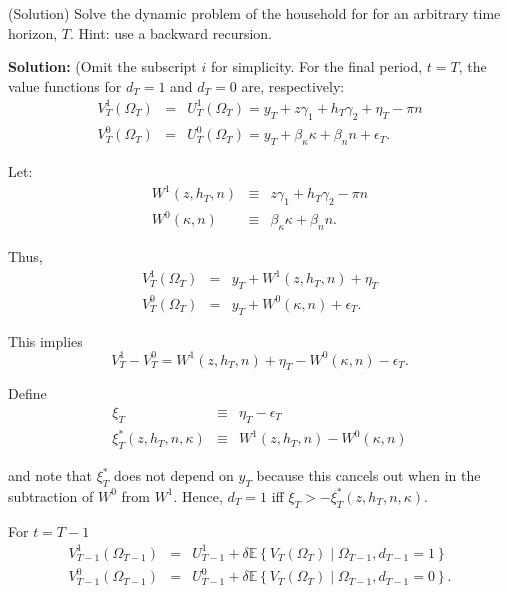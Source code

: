 \begin{exercise} (Solution)
Solve the dynamic problem of the household for for an arbitrary time horizon, $T$. Hint: use a backward recursion.
\end{exercise}

\noindent\textbf{Solution:}
\noindent (Omit the subscript $i$ for simplicity. For the final period, $t = T$, the value functions for $d_{T}=1$ and $d_{T}=0$ are, respectively:\\
\begin{eqnarray}
V^{1}_{T}\left(\Omega_{T}\right) &=& U^{1}_{T}\left(\Omega_{T}\right) = y_{T} + z\gamma_1 + h_{T}\gamma_2 + \eta_{T} - \pi n\\
V^{0}_{T}\left(\Omega_{T}\right) &=& U^{0}_{T}\left(\Omega_{T}\right) = y_{T} + \beta_\kappa \kappa + \beta_n n + \epsilon_T.
\end{eqnarray}

\noindent Let:
\begin{eqnarray}
W^1 \left(z,h_T,n\right) & \equiv & z \gamma_1 + h_T \gamma_2 - \pi n\\
W^0 \left(\kappa,n\right) & \equiv & \beta_\kappa \kappa + \beta_n n.
\end{eqnarray}

\noindent Thus, 
\begin{eqnarray}
V_T^1\left(\Omega_T\right) &=& y_T + W^1\left(z,h_T,n\right) + \eta_T \\
V_T^0\left(\Omega_T\right) &=& y_T + W^0\left(\kappa,n\right) + \epsilon_T.
\end{eqnarray}

\noindent This implies
\begin{equation}
V^1_T - V^0_T =  W^1\left(z,h_T,n\right) + \eta_T -   W^0\left(\kappa,n\right) - \epsilon_T.
\end{equation}

\noindent Define
\begin{eqnarray}
\xi_T & \equiv & \eta_T - \epsilon_T \\
\xi^{*}_T\left(z,h_T,n,\kappa\right) & \equiv & W^1\left(z,h_T,n\right) - W^0\left(\kappa,n\right)
\end{eqnarray}

\noindent and note that $\xi_T^*$ does not depend on $y_T$ because this cancels out when in the subtraction of $W^0$ from $W^1$. Hence, $d_T=1$ iff $\xi_T > -\xi^{*}_T\left(z,h_T,n,\kappa\right)$.

\indent For $t = T-1$
\begin{eqnarray}
V^{1}_{T-1}\left(\Omega_{T-1}\right) &=& U^{1}_{T-1} + 
\delta \mathbb{E} \left\{ V_T\left(\Omega_T\right) \middle| \Omega_{T-1}, d_{T-1}=1\right\} \\
V^{0}_{T-1}\left(\Omega_{T-1}\right) &=& U^{0}_{T-1} + 
\delta \mathbb{E} \left\{ V_T\left(\Omega_T\right) \middle| \Omega_{T-1}, d_{T-1}=0\right\}.
\end{eqnarray}

